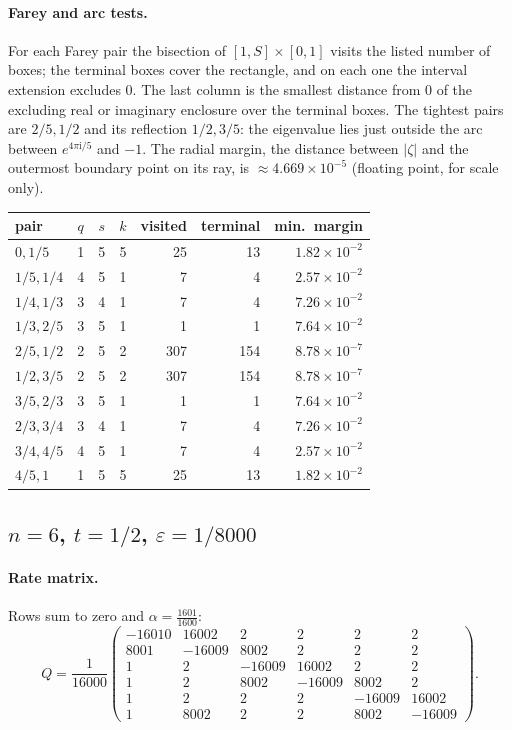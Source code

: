 \documentclass[11pt,a4paper]{article}
\numberwithin{equation}{section}
\theoremstyle{definition}
\theoremstyle{remark}
\newcommand{\ii}{\mathrm{i}}
\newcommand{\eps}{\varepsilon}
\begin{document}
\paragraph{Farey and arc tests.} For each Farey pair the bisection of \([1,S]\times[0,1]\) visits the listed number of boxes; the terminal boxes cover the rectangle, and on each one the interval extension excludes 0. The last column is the smallest distance from 0 of the excluding real or imaginary enclosure over the terminal boxes. The tightest pairs are \(2/5,1/2\) and its reflection \(1/2,3/5\): the eigenvalue lies just outside the arc between \(e^{4\pi\ii/5}\) and \(-1\). The radial margin, the distance between \(|\zeta|\) and the outermost boundary point on its ray, is \(\approx4.669\times10^{-5}\) (floating point, for scale only).
\begin{center}\small
\begin{tabular}{@{}lcccrrr@{}}
\toprule
pair & \(q\) & \(s\) & \(k\) & visited & terminal & min.\ margin\\
\midrule
\(0,1/5\) & 1 & 5 & 5 & 25 & 13 & \(1.82\times10^{-2}\)\\
\(1/5,1/4\) & 4 & 5 & 1 & 7 & 4 & \(2.57\times10^{-2}\)\\
\(1/4,1/3\) & 3 & 4 & 1 & 7 & 4 & \(7.26\times10^{-2}\)\\
\(1/3,2/5\) & 3 & 5 & 1 & 1 & 1 & \(7.64\times10^{-2}\)\\
\(2/5,1/2\) & 2 & 5 & 2 & 307 & 154 & \(8.78\times10^{-7}\)\\
\(1/2,3/5\) & 2 & 5 & 2 & 307 & 154 & \(8.78\times10^{-7}\)\\
\(3/5,2/3\) & 3 & 5 & 1 & 1 & 1 & \(7.64\times10^{-2}\)\\
\(2/3,3/4\) & 3 & 4 & 1 & 7 & 4 & \(7.26\times10^{-2}\)\\
\(3/4,4/5\) & 4 & 5 & 1 & 7 & 4 & \(2.57\times10^{-2}\)\\
\(4/5,1\) & 1 & 5 & 5 & 25 & 13 & \(1.82\times10^{-2}\)\\
\bottomrule
\end{tabular}
\end{center}

\subsection{\texorpdfstring{\(n=6\), \(t=1/2\), \(\eps=1/8000\)}{n=6}}

\paragraph{Rate matrix.} Rows sum to zero and \(\alpha=\tfrac{1601}{1600}\):
{\small\[Q=\frac{1}{16000}\begin{pmatrix}-16010&16002&2&2&2&2\\
8001&-16009&8002&2&2&2\\
1&2&-16009&16002&2&2\\
1&2&8002&-16009&8002&2\\
1&2&2&2&-16009&16002\\
1&8002&2&2&8002&-16009\end{pmatrix}.\]}
\end{document}
